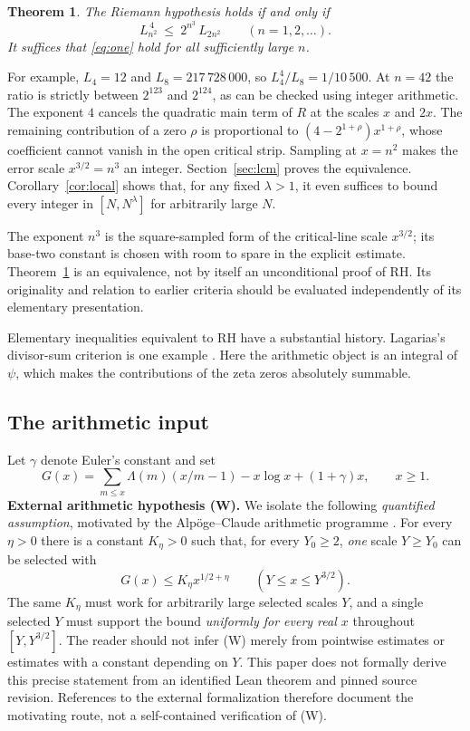 \documentclass[11pt,a4paper]{article}
\newtheorem{theorem}{Theorem}
\begin{document}
\begin{theorem}\label{thm:integer}
The Riemann hypothesis holds if and only if
\begin{equation}\label{eq:one}
 \boxed{\displaystyle L_{n^2}^{\,4}\ \le\ 2^{n^3}\,L_{2n^2}\qquad(n=1,2,\ldots).}
\end{equation}
It suffices that \eqref{eq:one} hold for all sufficiently large $n$.
\end{theorem}
For example, $L_4=12$ and $L_8=217\,728\,000$, so $L_4^4/L_8=1/10\,500$. At $n=42$ the ratio is strictly between $2^{123}$ and $2^{124}$, as can be checked using integer arithmetic. The exponent $4$ cancels the quadratic main term of $R$ at the scales $x$ and $2x$. The remaining contribution of a zero $\rho$ is proportional to $(4-2^{1+\rho})x^{1+\rho}$, whose coefficient cannot vanish in the open critical strip. Sampling at $x=n^2$ makes the error scale $x^{3/2}=n^3$ an integer. Section~\ref{sec:lcm} proves the equivalence. Corollary~\ref{cor:local} shows that, for any fixed $\lambda>1$, it even suffices to bound every integer in $[N,N^\lambda]$ for arbitrarily large $N$.

The exponent $n^3$ is the square-sampled form of the critical-line scale $x^{3/2}$; its base-two constant is chosen with room to spare in the explicit estimate. Theorem~\ref{thm:integer} is an equivalence, not by itself an unconditional proof of RH. Its originality and relation to earlier criteria should be evaluated independently of its elementary presentation.

Elementary inequalities equivalent to RH have a substantial history. Lagarias's divisor-sum criterion is one example \cite{lagarias}. Here the arithmetic object is an integral of $\psi$, which makes the contributions of the zeta zeros absolutely summable.

\subsection*{The arithmetic input}
Let $\gamma$ denote Euler's constant and set
\begin{equation}\label{eq:G}
 G(x)=\sum_{m\le x}\Lambda(m)(x/m-1)-x\log x+(1+\gamma)x,\qquad x\ge1.
\end{equation}
\textbf{External arithmetic hypothesis (W).} We isolate the following \emph{quantified assumption}, motivated by the Alp\"oge--Claude arithmetic programme \cite{alp,rub}. For every $\eta>0$ there is a constant $K_\eta>0$ such that, for every $Y_0\ge2$, \emph{one} scale $Y\ge Y_0$ can be selected with
\begin{equation}\tag{W}\label{eq:W}
  G(x)\le K_\eta x^{1/2+\eta}\qquad (Y\le x\le Y^{3/2}).
\end{equation}
The same $K_\eta$ must work for arbitrarily large selected scales $Y$, and a single selected $Y$ must support the bound \emph{uniformly for every real $x$} throughout $[Y,Y^{3/2}]$. The reader should not infer (W) merely from pointwise estimates or estimates with a constant depending on $Y$. This paper does not formally derive this precise statement from an identified Lean theorem and pinned source revision. References to the external formalization therefore document the motivating route, not a self-contained verification of (W).
\end{document}
